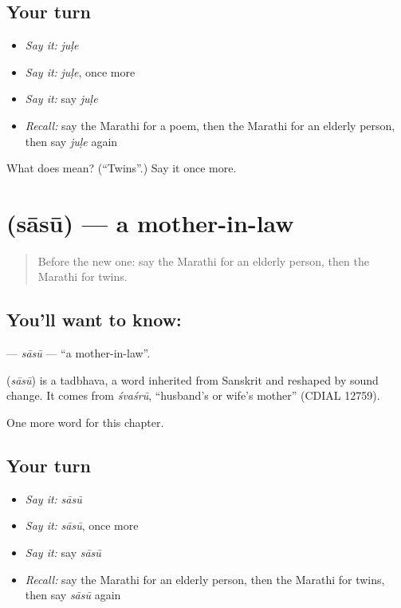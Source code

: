 \subsection*{Your turn}
\begin{itemize}
\raggedright
  \item \emph{Say it:} \emph{juḷe}
  \item \emph{Say it:} \emph{juḷe}, once more
  \item \emph{Say it:} say \emph{juḷe}
  \item \emph{Recall:} say the Marathi for a poem, then the Marathi for an elderly person, then say \emph{juḷe} again
\end{itemize}

\begin{tcolorbox}[breakable,colback=teal!4,colframe=teal!35!black,title={Before you move on}]
What does  mean? (\textquotedblleft{}Twins\textquotedblright{}.) Say it once more.
\end{tcolorbox}
\section[\texorpdfstring{\mr{सासू} (sāsū)}{सासू (sāsū)}]{ (sāsū) — a mother-in-law}

\label{lesson:MR-C264-sasu}



\begin{quote}
Before the new one: say the Marathi for an elderly person, then the Marathi for twins.
\end{quote}

\subsection*{You'll want to know: }
\textbf{} — \emph{sāsū} — \textquotedblleft{}a mother-in-law\textquotedblright{}.

\begin{cousinweb}
\textbf{} (\emph{sāsū}) is a tadbhava, a word inherited from Sanskrit and reshaped by sound change. It comes from \emph{śvaśrū}, \textquotedblleft{}husband's or wife's mother\textquotedblright{} (CDIAL 12759).
\end{cousinweb}

\begin{grammarlens}[title={What you've built}]
One more word for this chapter.
\end{grammarlens}

\subsection*{Your turn}
\begin{itemize}
\raggedright
  \item \emph{Say it:} \emph{sāsū}
  \item \emph{Say it:} \emph{sāsū}, once more
  \item \emph{Say it:} say \emph{sāsū}
  \item \emph{Recall:} say the Marathi for an elderly person, then the Marathi for twins, then say \emph{sāsū} again
\end{itemize}

